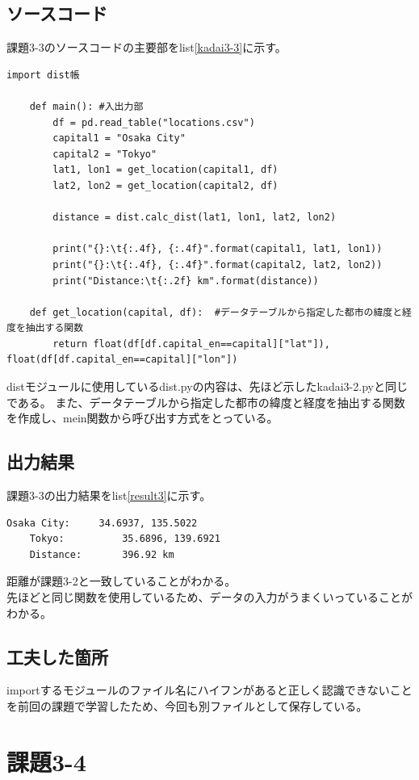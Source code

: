 \documentclass[a4paper]{ltjsarticle}
\begin{document}
\subsection*{ソースコード}
課題3-3のソースコードの主要部をlist\ref{kadai3-3}に示す。
\begin{lstlisting}[caption=kadai3-3.py,label=kadai3-3]
    import dist帳
    
    def main(): #入出力部
        df = pd.read_table("locations.csv")
        capital1 = "Osaka City"
        capital2 = "Tokyo"
        lat1, lon1 = get_location(capital1, df)
        lat2, lon2 = get_location(capital2, df)

        distance = dist.calc_dist(lat1, lon1, lat2, lon2)

        print("{}:\t{:.4f}, {:.4f}".format(capital1, lat1, lon1))
        print("{}:\t{:.4f}, {:.4f}".format(capital2, lat2, lon2))
        print("Distance:\t{:.2f} km".format(distance))

    def get_location(capital, df):  #データテーブルから指定した都市の緯度と経度を抽出する関数
        return float(df[df.capital_en==capital]["lat"]), float(df[df.capital_en==capital]["lon"])
\end{lstlisting}
distモジュールに使用しているdist.pyの内容は、先ほど示したkadai3-2.pyと同じである。
また、データテーブルから指定した都市の緯度と経度を抽出する関数を作成し、mein関数から呼び出す方式をとっている。

\subsection*{出力結果}
課題3-3の出力結果をlist\ref{result3}に示す。
\begin{lstlisting}[caption=output, label=result3]
    Osaka City:     34.6937, 135.5022
    Tokyo:          35.6896, 139.6921
    Distance:       396.92 km
\end{lstlisting}
距離が課題3-2と一致していることがわかる。
\\先ほどと同じ関数を使用しているため、データの入力がうまくいっていることがわかる。

\subsection*{工夫した箇所}
importするモジュールのファイル名にハイフンがあると正しく認識できないことを前回の課題で学習したため、今回も別ファイルとして保存している。
\newpage

\section*{課題3-4}
\end{document}
